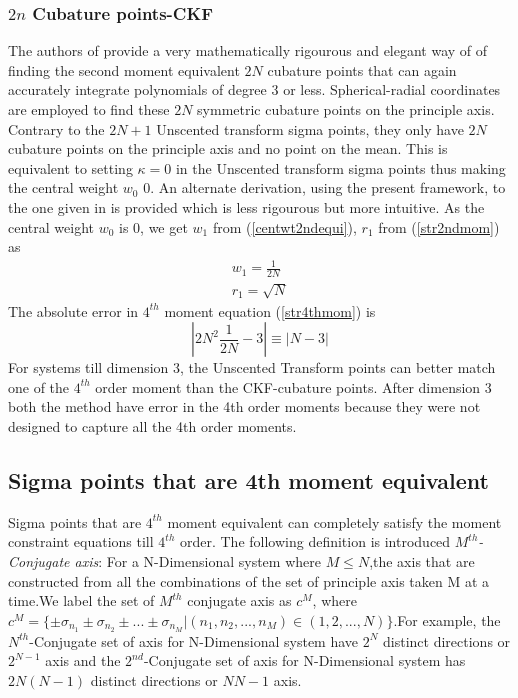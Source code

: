 \documentclass[letterpaper, 10 pt, conference]{ieeeconf}  %
\begin{document}
\subsubsection{$2n$ Cubature points-CKF}
The authors of \cite{c2} provide a very mathematically rigourous and elegant way of of finding the second moment equivalent $2N$ cubature points that can again accurately integrate polynomials of degree 3 or less. Spherical-radial coordinates are employed to find these $2N$ symmetric cubature points on the principle axis. Contrary to the $2N+1$ Unscented transform sigma points, they only have $2N$ cubature  points on the principle axis and no point on the mean. This is equivalent to setting $\kappa=0$ in the Unscented transform sigma points thus making the central weight $w_0$ 0. An alternate derivation, using the present framework, to the one given in \cite{c2} is provided which is less rigourous but more intuitive. As the central weight $w_0$ is 0, we get $w_1$ from (\ref{centwt2ndequi}), $r_1$ from (\ref{str2ndmom}) as
\setlength{\arraycolsep}{0.0em}
\begin{eqnarray}
w_1=\frac{1}{2N}\\
r_1=\sqrt{N}
\end{eqnarray}
\setlength{\arraycolsep}{5pt}    
The absolute error in $4^{th}$ moment equation (\ref{str4thmom}) is
\begin{equation}
|2N^2\frac{1}{2N}-3|\equiv |N-3|
\end{equation} 
For systems till dimension 3, the Unscented Transform points can better match one of the $4^{th}$ order moment than the CKF-cubature points. After dimension 3 both the method have error in the 4th order moments because they were not designed to capture all the 4th order moments.

\subsection{Sigma points that are 4th moment equivalent}
Sigma points that are $4^{th}$ moment equivalent can completely satisfy the moment constraint equations till $4^{th}$ order. The following definition is introduced \newline 
\emph{$M^{th}$-Conjugate axis}: For a N-Dimensional system where $M\le N$,the axis that are constructed from all the combinations of the set of principle axis taken M at a time.We label the set of $M^{th}$ conjugate axis as  $c^M$, where $c^M=\{\pm\sigma_{n_1}\pm\sigma_{n_2} \pm ...\pm \sigma_{n_M}|(n_1,n_2,...,n_M)\in (1,2,...,N)\}$.For example, the $N^{th}$-Conjugate set of axis for N-Dimensional system have $2^N$ distinct directions or $2^{N-1}$ axis and the $2^{nd}$-Conjugate set of axis for N-Dimensional system has $2N(N-1)$ distinct directions or $N{N-1}$ axis.
\end{document}
